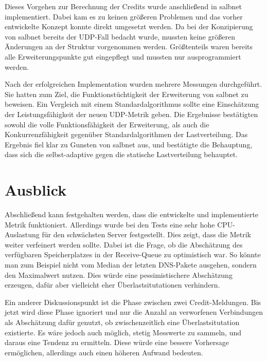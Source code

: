 \documentclass[a4paper, 12pt, BCOR10mm, DIV12, toc=bibliography, toc=listof, german]{scrbook}
\begin{document}
		Dieses Vorgehen zur Berechnung der Credits wurde anschließend in salbnet implementiert. Dabei
		kam es zu keinen größeren Problemen und das vorher entwickelte Konzept konnte direkt umgesetzt
		werden. Da bei der Konzipierung von salbnet bereits der UDP-Fall bedacht wurde, mussten keine
		größeren Änderungen an der Struktur vorgenommen werden. Größtenteils waren bereits alle
		Erweiterungspunkte gut eingepflegt und mussten nur ausprogrammiert werden.
		
		Nach der erfolgreichen Implementation wurden mehrere Messungen durchgeführt. Sie hatten zum
		Ziel, die Funktionstüchtigkeit der Erweiterung von salbnet zu beweisen. Ein Vergleich mit
		einem Standardalgorithmus sollte eine Einschätzung der Leistungsfähigkeit der neuen UDP-Metrik
		geben.  Die Ergebnisse bestätigten sowohl die volle Funktionsfähigkeit der Erweiterung, als auch
		die Konkurrenzfähigkeit gegenüber Standardalgorithmen der Lastverteilung. Das Ergebnis fiel klar
		zu Gunsten von salbnet aus, und bestätigte die Behauptung, dass sich die selbst-adaptive
		gegen die statische Lastverteilung behauptet.


		\section{Ausblick} %
		\label{sec:ausblick}

		Abschließend kann festgehalten werden, dass die entwickelte und implementierte Metrik
		funktioniert. Allerdings wurde bei den Tests eine sehr hohe CPU-Auslastung für den schwächsten
		Server festgestellt. Dies zeigt, dass die Metrik weiter verfeinert werden sollte. Dabei ist die
		Frage, ob die Abschätzung des verfügbaren Speicherplatzes in der Receive-Queue zu optimistisch war.
		So könnte man zum Beispiel nicht vom Median der letzten DNS-Pakete ausgehen, sondern den Maximalwert nutzen.
		Dies würde eine pessimistischere Abschätzung erzeugen, dafür aber vielleicht eher
		Überlastsitutationen verhindern.

		Ein anderer Diskussionspunkt ist die Phase zwischen zwei Credit-Meldungen. Bis jetzt wird diese
		Phase ignoriert und nur die Anzahl an verworfenen Verbindungen als Abschätzung dafür genutzt, ob
		zwischenzeitlich eine Überlastsitutation existierte. Es wäre jedoch auch möglich, stetig
		Messwerte zu sammeln, und daraus eine Tendenz zu ermitteln. Diese würde eine bessere Vorhersage
		ermöglichen, allerdings auch einen höheren Aufwand bedeuten.
\end{document}

